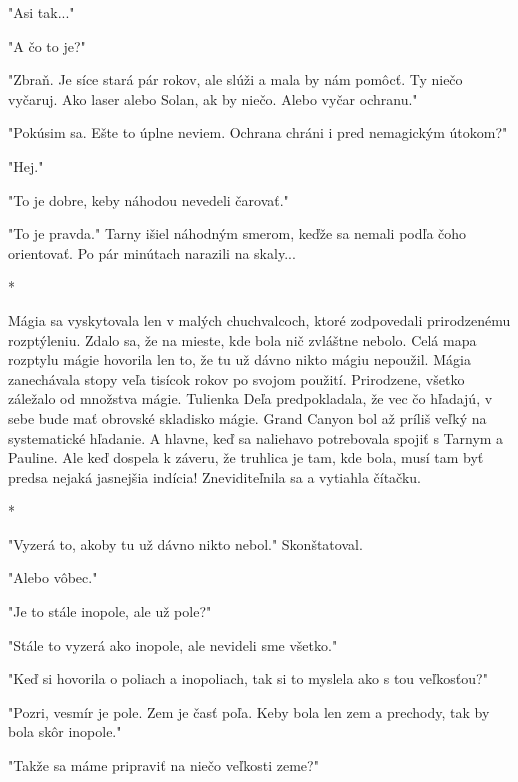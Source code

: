 \documentclass{book}
\begin{document}
"$ $Asi tak..."$ $ 

"$ $A čo to je?"$ $ 

"$ $Zbraň. Je síce stará pár rokov, ale slúži a mala by nám pomôcť. Ty niečo vyčaruj. Ako laser alebo Solan, ak by niečo. Alebo vyčar ochranu."$ $ 

"$ $Pokúsim sa. Ešte to úplne neviem. Ochrana chráni i pred nemagickým útokom?"$ $ 

"$ $Hej."$ $ 

"$ $To je dobre, keby náhodou nevedeli čarovať."$ $ 

"$ $To je pravda."$ $  Tarny išiel náhodným smerom, keďže sa nemali podľa čoho orientovať. Po pár minútach narazili na skaly...

\begin{center}

*

\end{center}

Mágia sa vyskytovala len v malých chuchvalcoch, ktoré zodpovedali prirodzenému rozptýleniu. Zdalo sa, že na mieste, kde bola nič zvláštne nebolo. Celá mapa rozptylu mágie hovorila len to, že tu už dávno nikto mágiu nepoužil. Mágia zanechávala stopy veľa tisícok rokov po svojom použití. Prirodzene, všetko záležalo od množstva mágie. Tulienka Deľa predpokladala, že vec čo hľadajú, v sebe bude mať obrovské skladisko mágie. Grand Canyon bol až príliš veľký na systematické hľadanie. A hlavne, keď sa naliehavo potrebovala spojiť s Tarnym a Pauline. Ale keď dospela k záveru, že truhlica je tam, kde bola, musí tam byť predsa nejaká jasnejšia indícia! Zneviditeľnila sa a vytiahla čítačku.

\begin{center}

*

\end{center}

"$ $Vyzerá to, akoby tu už dávno nikto nebol."$ $  Skonštatoval.

"$ $Alebo vôbec."$ $ 

"$ $Je to stále inopole, ale už pole?"$ $ 

"$ $Stále to vyzerá ako inopole, ale nevideli sme všetko."$ $ 

"$ $Keď si hovorila o poliach a inopoliach, tak si to myslela ako s tou veľkosťou?"$ $ 

"$ $Pozri, vesmír je pole. Zem je časť poľa. Keby bola len zem a prechody, tak by bola skôr inopole."$ $ 

"$ $Takže sa máme pripraviť na niečo veľkosti zeme?"$ $ 
\end{document}
